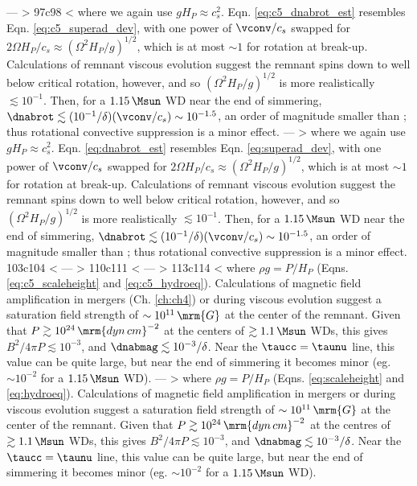 ---
> \label{eq:dnabrot_est}
97c98
< \noindent where we again use $g H_P \approx c_s^2$.  Eqn. \ref{eq:c5_dnabrot_est} resembles Eqn. \ref{eq:c5_superad_dev}, with one power of $\vconv/c_s$ swapped for $2\Omega H_P/c_s \approx (\Omega^2 H_P/g)^{1/2}$, which is at most $\sim1$ for rotation at break-up.  Calculations of remnant viscous evolution \citep{shen+12, schw+12, ji+13} suggest the remnant spins down to well below critical rotation, however, and so $(\Omega^2 H_P/g)^{1/2}$ is more realistically $\lesssim10^{-1}$.  Then, for a $1.15\,\Msun$ WD near the end of simmering, $\dnabrot \lesssim (10^{-1}/\delta)(\vconv/c_s) \sim 10^{-1.5}$, an order of magnitude smaller than \nablaad; thus rotational convective suppression is a minor effect.  
---
> \noindent where we again use $g H_P \approx c_s^2$.  Eqn. \ref{eq:dnabrot_est} resembles Eqn. \ref{eq:superad_dev}, with one power of $\vconv/c_s$ swapped for $2\Omega H_P/c_s \approx (\Omega^2 H_P/g)^{1/2}$, which is at most $\sim1$ for rotation at break-up.  Calculations of remnant viscous evolution \citep{shen+12, schw+12, ji+13} suggest the remnant spins down to well below critical rotation, however, and so $(\Omega^2 H_P/g)^{1/2}$ is more realistically $\lesssim10^{-1}$.  Then, for a $1.15\,\Msun$ WD near the end of simmering, $\dnabrot \lesssim (10^{-1}/\delta)(\vconv/c_s) \sim 10^{-1.5}$, an order of magnitude smaller than \nablaad; thus rotational convective suppression is a minor effect.  
103c104
< \label{eq:c5_dnabmag_est_work}
---
> \label{eq:dnabmag_est_work}
110c111
< \label{eq:c5_dnabmag_est}
---
> \label{eq:dnabmag_est}
113c114
< \noindent where $\rho g = P/H_P$ (Eqns. \ref{eq:c5_scaleheight} and \ref{eq:c5_hydroeq}).  Calculations of magnetic field amplification in mergers (Ch. \ref{ch:ch4}) or during viscous evolution \citep{ji+13} suggest a saturation field strength of $\sim10^{11}\,\mrm{G}$ at the center of the remnant.  Given that $P \gtrsim 10^{24}\,\mrm{dyn\,cm}^{-2}$ at the centers of $\gtrsim 1.1\,\Msun$ WDs, this gives $B^2/4\pi P \lesssim 10^{-3}$, and $\dnabmag \lesssim 10^{-3}/\delta$.  Near the $\taucc = \taunu$ line, this value can be quite large, but near the end of simmering it becomes minor (eg. $\sim10^{-2}$ for a $1.15\,\Msun$ WD).
---
> \noindent where $\rho g = P/H_P$ (Eqns. \ref{eq:scaleheight} and \ref{eq:hydroeq}).  Calculations of magnetic field amplification in mergers \citep{zhu+15} or during viscous evolution \citep{ji+13} suggest a saturation field strength of $\sim10^{11}\,\mrm{G}$ at the center of the remnant.  Given that $P \gtrsim 10^{24}\,\mrm{dyn\,cm}^{-2}$ at the centres of $\gtrsim 1.1\,\Msun$ WDs, this gives $B^2/4\pi P \lesssim 10^{-3}$, and $\dnabmag \lesssim 10^{-3}/\delta$.  Near the $\taucc = \taunu$ line, this value can be quite large, but near the end of simmering it becomes minor (eg. $\sim10^{-2}$ for a $1.15\,\Msun$ WD).
